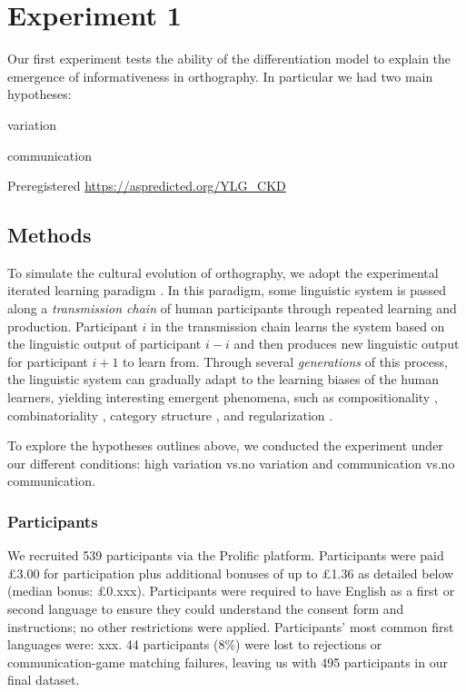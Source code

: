 \documentclass[doc,biblatex]{apa7}
\begin{document}

\section{Experiment 1}

Our first experiment tests the ability of the differentiation model to explain the emergence of informativeness in orthography. In particular we had two main hypotheses:

variation

communication

Preregistered \url{https://aspredicted.org/YLG_CKD}

\subsection{Methods}

To simulate the cultural evolution of orthography, we adopt the experimental iterated learning paradigm \parencite{Kirby:2008, Kirby:2015}. In this paradigm, some linguistic system is passed along a \textit{transmission chain} of human participants through repeated learning and production. Participant $i$ in the transmission chain learns the system based on the linguistic output of participant $i-i$ and then produces new linguistic output for participant $i+1$ to learn from. Through several \textit{generations} of this process, the linguistic system can gradually adapt to the learning biases of the human learners, yielding interesting emergent phenomena, such as compositionality \parencite{Kirby:2008, Kirby:2015}, combinatoriality \parencite{Verhoef:2015}, category structure \parencite{Carr:2017, Carr:2020}, and regularization \parencite{Smith:2010, Ferdinand:2019}.

To explore the hypotheses outlines above, we conducted the experiment under our different conditions: high variation vs.\@ no variation and communication vs.\@ no communication.

\subsubsection{Participants}

We recruited 539 participants via the Prolific platform. Participants were paid £3.00 for participation plus additional bonuses of up to £1.36 as detailed below (median bonus: £0.xxx). Participants were required to have English as a first or second language to ensure they could understand the consent form and instructions; no other restrictions were applied. Participants' most common first languages were: xxx. 44 participants (8\%) were lost to rejections or communication-game matching failures, leaving us with 495 participants in our final dataset.
\end{document}

